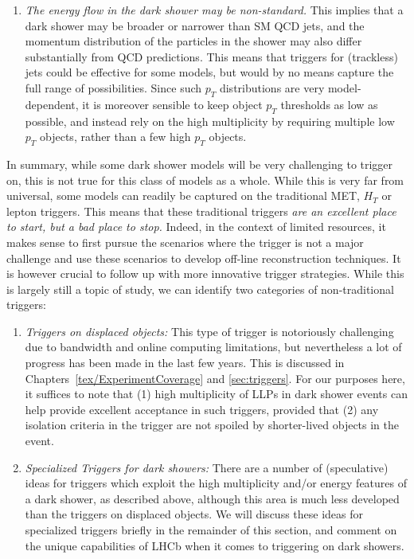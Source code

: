 \begin{enumerate}
\item \emph{The energy flow in the dark shower may be non-standard.} This implies that a dark shower may be broader or narrower than SM QCD jets, and the momentum distribution of the particles in the shower may also differ substantially from QCD predictions. This means that triggers for (trackless) jets could be effective for some models, but would by no means capture the full range of possibilities. Since such $p_T$ distributions are very model-dependent, it is moreover sensible to keep object $p_T$ thresholds as low as possible, and instead rely on the high multiplicity by requiring multiple low $p_T$ objects, rather than a few high $p_T$ objects. 
\end{enumerate}

In summary, while some dark shower models will be very challenging to trigger on, this is not true for this class of models as a whole. While this is very far from universal, some models can readily be captured on the traditional MET, $H_T$ or lepton triggers. This means that these traditional triggers \emph{are an excellent place to start, but a bad place to stop.} Indeed, in the context of limited resources, it makes sense to first pursue the scenarios where the trigger is not a major challenge and use these scenarios to develop off-line reconstruction techniques. It is however crucial to follow up with more innovative trigger strategies. While this is largely still a topic of study, we can identify two categories of non-traditional triggers:
\begin{enumerate}
\item \emph{Triggers on displaced objects:} This type of trigger is notoriously challenging due to bandwidth and online computing limitations, but nevertheless a lot of progress has been made in the last few years. This is discussed in Chapters~\ref{tex/ExperimentCoverage} and \ref{sec:triggers}.  For our purposes here, it suffices to note that (1) high multiplicity of LLPs in dark shower events can help provide excellent acceptance in such triggers, provided that (2) any isolation criteria in the trigger are not spoiled by shorter-lived objects in the event.

\item \emph{Specialized Triggers for dark showers:} There are a number of (speculative) ideas for triggers which exploit the high multiplicity and/or energy features of a dark shower, as described above, although this area is much less developed than the triggers on displaced objects. We will discuss these ideas for specialized triggers briefly in the remainder of this section, and comment on the unique capabilities of LHCb when it comes to triggering on dark showers. 


\end{enumerate}



